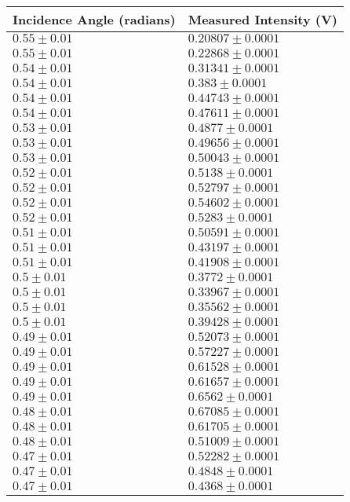 \begin{tabular}{| p{} | p{} |}
\hline
Incidence Angle (radians) & Measured Intensity (V)\\
\hline
$0.55 \pm 0.01$ & $0.20807 \pm 0.0001$\\
$0.55 \pm 0.01$ & $0.22868 \pm 0.0001$\\
$0.54 \pm 0.01$ & $0.31341 \pm 0.0001$\\
$0.54 \pm 0.01$ & $0.383 \pm 0.0001$\\
$0.54 \pm 0.01$ & $0.44743 \pm 0.0001$\\
$0.54 \pm 0.01$ & $0.47611 \pm 0.0001$\\
$0.53 \pm 0.01$ & $0.4877 \pm 0.0001$\\
$0.53 \pm 0.01$ & $0.49656 \pm 0.0001$\\
$0.53 \pm 0.01$ & $0.50043 \pm 0.0001$\\
$0.52 \pm 0.01$ & $0.5138 \pm 0.0001$\\
$0.52 \pm 0.01$ & $0.52797 \pm 0.0001$\\
$0.52 \pm 0.01$ & $0.54602 \pm 0.0001$\\
$0.52 \pm 0.01$ & $0.5283 \pm 0.0001$\\
$0.51 \pm 0.01$ & $0.50591 \pm 0.0001$\\
$0.51 \pm 0.01$ & $0.43197 \pm 0.0001$\\
$0.51 \pm 0.01$ & $0.41908 \pm 0.0001$\\
$0.5 \pm 0.01$ & $0.3772 \pm 0.0001$\\
$0.5 \pm 0.01$ & $0.33967 \pm 0.0001$\\
$0.5 \pm 0.01$ & $0.35562 \pm 0.0001$\\
$0.5 \pm 0.01$ & $0.39428 \pm 0.0001$\\
$0.49 \pm 0.01$ & $0.52073 \pm 0.0001$\\
$0.49 \pm 0.01$ & $0.57227 \pm 0.0001$\\
$0.49 \pm 0.01$ & $0.61528 \pm 0.0001$\\
$0.49 \pm 0.01$ & $0.61657 \pm 0.0001$\\
$0.49 \pm 0.01$ & $0.6562 \pm 0.0001$\\
$0.48 \pm 0.01$ & $0.67085 \pm 0.0001$\\
$0.48 \pm 0.01$ & $0.61705 \pm 0.0001$\\
$0.48 \pm 0.01$ & $0.51009 \pm 0.0001$\\
$0.47 \pm 0.01$ & $0.52282 \pm 0.0001$\\
$0.47 \pm 0.01$ & $0.4848 \pm 0.0001$\\
$0.47 \pm 0.01$ & $0.4368 \pm 0.0001$\\
\hline
\end{tabular}\\
